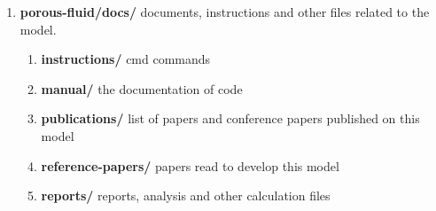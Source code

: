 \documentclass[
	12pt
] {article}
\begin{document}
	\begin{enumerate}
		\item \textbf{porous-fluid/docs/} documents, instructions and other files related to the model.
			\begin{enumerate}
				\item \textbf{instructions/} cmd commands
				\item \textbf{manual/} the documentation of code
				\item \textbf{publications/} list of papers and conference papers published on this model
				\item \textbf{reference-papers/} papers read to develop this model
				\item \textbf{reports/} reports, analysis and other calculation files
			\end{enumerate}


\end{enumerate}
\end{document}

